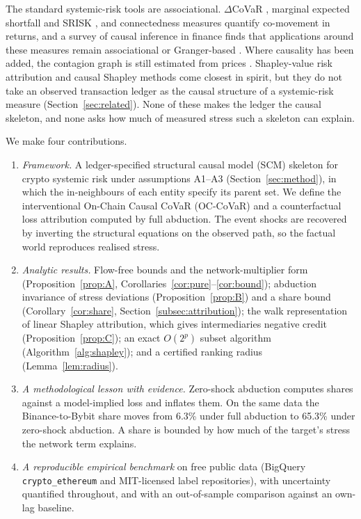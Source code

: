 \documentclass[referee,pdflatex,sn-mathphys-ay]{sn-jnl}
\theoremstyle{thmstyleone}%
\theoremstyle{thmstyletwo}%
\theoremstyle{thmstylethree}%
\begin{document}
The standard systemic-risk tools are associational. $\Delta$CoVaR \citep{adrian2016covar},
marginal expected shortfall and SRISK \citep{acharya2017measuring}, and connectedness
measures \citep{diebold2014network,billio2012econometric} quantify co-movement in
returns, and a survey of causal inference in finance finds that applications around
these measures remain associational or Granger-based \citep{kumar2025causalreview}. Where
causality has been added, the contagion graph is still estimated from prices
\citep{rigana2024neco,rigana2023new,etesami2023tvdig,giudici2018corisk}. Shapley-value
risk attribution \citep{tarashev2016attributing} and causal Shapley methods
\citep{heskes2020causal,singal2021flow} come closest in spirit, but they do not take an observed
transaction ledger as the causal structure of a systemic-risk measure (Section~\ref{sec:related}).
None of these makes the ledger the causal skeleton, and none asks how much of measured
stress such a skeleton can explain.

We make four contributions.
\begin{enumerate}[label=(\roman*),leftmargin=*]
\item \emph{Framework.} A ledger-specified structural causal model (SCM) skeleton for crypto
systemic risk under assumptions A1--A3 (Section~\ref{sec:method}), in which the in-neighbours of
each entity specify its parent set. We define the interventional On-Chain Causal CoVaR
(OC-CoVaR) and a counterfactual loss attribution computed by full abduction. The event shocks
are recovered by inverting the structural equations on the observed path, so the factual world
reproduces realised stress.
\item \emph{Analytic results.} Flow-free bounds and the network-multiplier form (Proposition~\ref{prop:A},
Corollaries~\ref{cor:pure}--\ref{cor:bound}); abduction invariance of stress deviations
(Proposition~\ref{prop:B}) and a share bound (Corollary~\ref{cor:share}, Section~\ref{subsec:attribution});
the walk representation of linear Shapley attribution, which gives intermediaries negative credit
(Proposition~\ref{prop:C}); an exact $O(2^p)$ subset algorithm (Algorithm~\ref{alg:shapley}); and a
certified ranking radius (Lemma~\ref{lem:radius}).
\item \emph{A methodological lesson with evidence.} Zero-shock abduction computes shares against a
model-implied loss and inflates them. On the same data the Binance-to-Bybit share moves from
6.3\% under full abduction to 65.3\% under zero-shock abduction. A share
is bounded by how much of the target's stress the network term explains.
\item \emph{A reproducible empirical benchmark} on free public data (BigQuery \texttt{crypto\_ethereum}
and MIT-licensed label repositories), with uncertainty quantified throughout, and with an
out-of-sample comparison against an own-lag baseline.
\end{enumerate}
\end{document}

